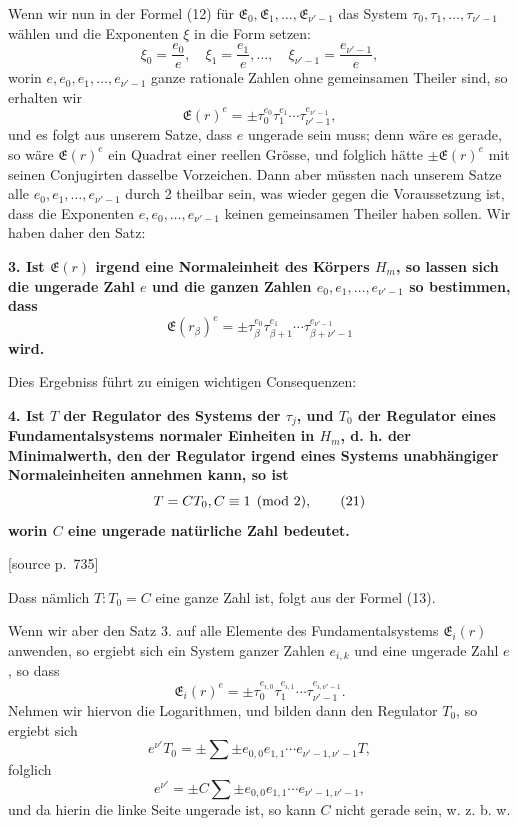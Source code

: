 \documentclass[11pt]{article}
\newcommand{\srcpage}[1]{\par\medskip\noindent\textsf{[source p.~#1]}\par\smallskip}
\begin{document}
Wenn wir nun in der Formel (12) für $\mathfrak E_0,\mathfrak E_1,\ldots,\mathfrak E_{\nu'-1}$ das System $\tau_0,\tau_1,\ldots,\tau_{\nu'-1}$ wählen und die Exponenten $\xi$ in die Form setzen:
\[
\xi_0=\frac{e_0}{e},\quad \xi_1=\frac{e_1}{e},\ldots,\quad \xi_{\nu'-1}=\frac{e_{\nu'-1}}{e},
\]
worin $e,e_0,e_1,\ldots,e_{\nu'-1}$ ganze rationale Zahlen ohne gemeinsamen Theiler sind, so erhalten wir
\[
\mathfrak E(r)^e=\pm\tau_0^{e_0}\tau_1^{e_1}\cdots\tau_{\nu'-1}^{e_{\nu'-1}},
\]
und es folgt aus unserem Satze, dass $e$ ungerade sein muss; denn wäre es gerade, so wäre $\mathfrak E(r)^e$ ein Quadrat einer reellen Grösse, und folglich hätte $\pm\mathfrak E(r)^e$ mit seinen Conjugirten dasselbe Vorzeichen. Dann aber müssten nach unserem Satze alle $e_0,e_1,\ldots,e_{\nu'-1}$ durch 2 theilbar sein, was wieder gegen die Voraussetzung ist, dass die Exponenten $e,e_0,\ldots,e_{\nu'-1}$ keinen gemeinsamen Theiler haben sollen. Wir haben daher den Satz:

\begin{center}\textbf{3. Ist $\mathfrak E(r)$ irgend eine Normaleinheit des Körpers $H_m$, so lassen sich die ungerade Zahl $e$ und die ganzen Zahlen $e_0,e_1,\ldots,e_{\nu'-1}$ so bestimmen, dass}
\[
\mathfrak E(r_\beta)^e=\pm\tau_\beta^{e_0}\tau_{\beta+1}^{e_1}\cdots\tau_{\beta+\nu'-1}^{e_{\nu'-1}}
\tag{20}
\]
\textbf{wird.}\end{center}

Dies Ergebniss führt zu einigen wichtigen Consequenzen:

\begin{center}\textbf{4. Ist $T$ der Regulator des Systems der $\tau_j$, und $T_0$ der Regulator eines Fundamentalsystems normaler Einheiten in $H_m$, d. h. der Minimalwerth, den der Regulator irgend eines Systems unabhängiger Normaleinheiten annehmen kann, so ist}
\[
T=CT_0,\\ C\equiv1\pmod2,
\tag{21}
\]
\textbf{worin $C$ eine ungerade natürliche Zahl bedeutet.}\end{center}

\srcpage{735}
Dass nämlich $T:T_0=C$ eine ganze Zahl ist, folgt aus der Formel (13).

Wenn wir aber den Satz 3. auf alle Elemente des Fundamentalsystems $\mathfrak E_i(r)$ anwenden, so ergiebt sich ein System ganzer Zahlen $e_{i,k}$ und eine ungerade Zahl $e$, so dass
\[
\mathfrak E_i(r)^e=\pm\tau_0^{e_{i,0}}\tau_1^{e_{i,1}}\cdots\tau_{\nu'-1}^{e_{i,\nu'-1}}.
\]
Nehmen wir hiervon die Logarithmen, und bilden dann den Regulator $T_0$, so ergiebt sich
\[
e^{\nu'}T_0=\pm\sum\pm e_{0,0}e_{1,1}\cdots e_{\nu'-1,\nu'-1}T,
\]
folglich
\[
e^{\nu'}=\pm C\sum\pm e_{0,0}e_{1,1}\cdots e_{\nu'-1,\nu'-1},
\]
und da hierin die linke Seite ungerade ist, so kann $C$ nicht gerade sein, w. z. b. w.
\end{document}
